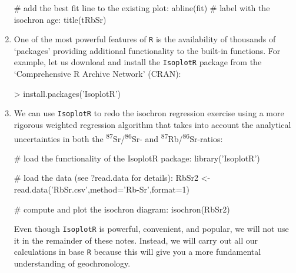 \begin{enumerate}
\begin{script}[firstnumber=7]
# add the best fit line to the existing plot:
abline(fit)
# label with the isochron age: 
title(tRbSr)
\end{script}

\item\label{it:installingIsoplotR} One of the most powerful features
  of \texttt{R} is the availability of thousands of `packages'
  providing additional functionality to the built-in functions.  For
  example, let us download and install the \texttt{IsoplotR} package
  from the `Comprehensive R Archive Network' (CRAN):

\begin{console}
> install.packages('IsoplotR')
\end{console}

\item We can use \texttt{IsoplotR} to redo the isochron regression
  exercise using a more rigorous weighted regression algorithm that
  takes into account the analytical uncertainties in both the
  \textsuperscript{87}Sr/\textsuperscript{86}Sr- and
  \textsuperscript{87}Rb/\textsuperscript{86}Sr-ratios:

\begin{script}
# load the functionality of the IsoplotR package:
library('IsoplotR')

# load the data (see ?read.data for details):
RbSr2 <- read.data('RbSr.csv',method='Rb-Sr',format=1)

# compute and plot the isochron diagram:
isochron(RbSr2)
\end{script}

Even though \texttt{IsoplotR} is powerful, convenient, and popular, we
will not use it in the remainder of these notes. Instead, we will
carry out all our calculations in base \texttt{R} because this will
give you a more fundamental understanding of geochronology.
\end{enumerate}
